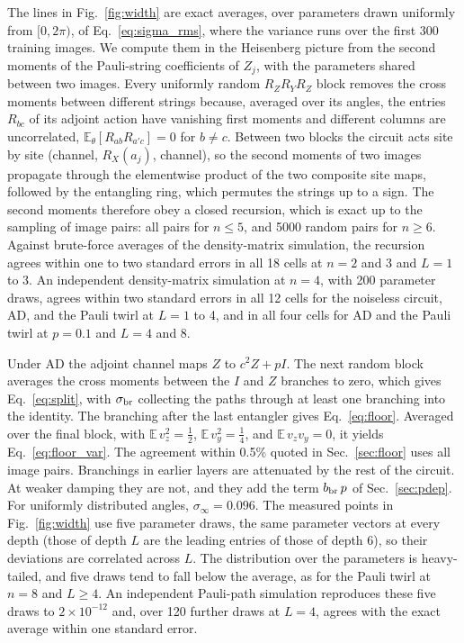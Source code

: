 \documentclass[
 aps,pra,
 twocolumn,
 superscriptaddress,
 longbibliography,
 nofootinbib
]{revtex4-2}
\begin{document}
The lines in Fig.~\ref{fig:width} are exact averages, over parameters drawn
uniformly from $[0,2\pi)$, of Eq.~\eqref{eq:sigma_rms}, where the variance
runs over the first 300 training images. We compute them in
the Heisenberg picture from the second moments of the Pauli-string
coefficients of $Z_j$, with the parameters shared between two images. Every
uniformly random $R_ZR_YR_Z$ block removes the cross moments between different
strings because, averaged over its angles, the entries $R_{bc}$ of its
adjoint action have vanishing first moments and different columns are
uncorrelated, $\mathbb E_\theta[R_{ab}R_{a'c}]=0$ for $b\neq c$. Between two
blocks the circuit acts site by site (channel, $R_X(a_j)$, channel), so the
second moments of two images propagate through the elementwise product of the
two composite site maps, followed by the entangling ring, which permutes the
strings up to a sign. The second moments therefore obey a closed recursion, which is exact up
to the sampling of image pairs: all pairs for $n\le5$, and 5000 random pairs
for $n\ge6$. Against brute-force averages of the density-matrix simulation,
the recursion agrees within one to two standard errors in all 18 cells at
$n=2$ and 3 and $L=1$ to 3. An independent density-matrix simulation at $n=4$, with 200 parameter draws, agrees within two standard errors in all 12 cells for the noiseless circuit, AD, and the Pauli twirl at $L=1$ to 4, and in all four cells for AD and the Pauli twirl at $p=0.1$ and $L=4$ and 8.

Under AD the adjoint channel maps $Z$ to $c^2Z+pI$. The next random block
averages the cross moments between the $I$ and $Z$ branches to zero, which
gives Eq.~\eqref{eq:split}, with $\sigma_{\rm br}$ collecting the paths through
at least one branching into the identity. The
branching after the last entangler gives Eq.~\eqref{eq:floor}. Averaged over
the final block, with $\mathbb E\,v_z^2=\frac12$, $\mathbb E\,v_y^2=\frac14$, and
$\mathbb E\,v_zv_y=0$, it yields Eq.~\eqref{eq:floor_var}. The agreement
within 0.5\% quoted in Sec.~\ref{sec:floor} uses all image pairs.
Branchings in earlier layers are attenuated by the rest of the circuit. At
weaker damping they are not, and they add the term $b_{\rm br}\,p$ of
Sec.~\ref{sec:pdep}. For uniformly
distributed angles, $\sigma_\infty=0.096$. The measured points in
Fig.~\ref{fig:width} use five parameter draws, the same parameter vectors at
every depth (those of depth $L$ are the leading entries of those of depth 6),
so their deviations are correlated across $L$. The distribution over the
parameters is heavy-tailed, and five draws tend to fall below the average, as
for the Pauli twirl at $n=8$ and $L\ge4$. An independent Pauli-path simulation
reproduces these five draws to $2\times10^{-12}$ and, over 120 further draws
at $L=4$, agrees with the exact average within one standard error.
\end{document}

